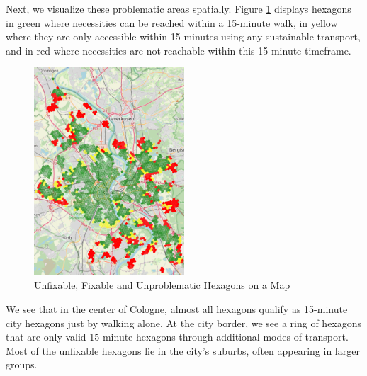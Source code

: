 Next, we visualize these problematic areas spatially.
Figure \ref{fig:problematic_hexagons} displays hexagons in green where necessities can be reached within a 15-minute walk, in yellow where they are only accessible within 15 minutes using any sustainable transport, and in red where necessities are not reachable within this 15-minute timeframe.
\begin{figure}
  \begin{center}
    \includegraphics[width=0.50\textwidth]{Figures/results/problematic_hexagons/problematic_hexagons}
  \end{center}
  \caption{Unfixable, Fixable and Unproblematic Hexagons on a Map}
  \label{fig:problematic_hexagons}
\end{figure}
We see that in the center of Cologne, almost all hexagons qualify as 15-minute city hexagons just by walking alone.
At the city border, we see a ring of hexagons that are only valid 15-minute hexagons through additional modes of transport.
Most of the unfixable hexagons lie in the city's suburbs, often appearing in larger groups.


